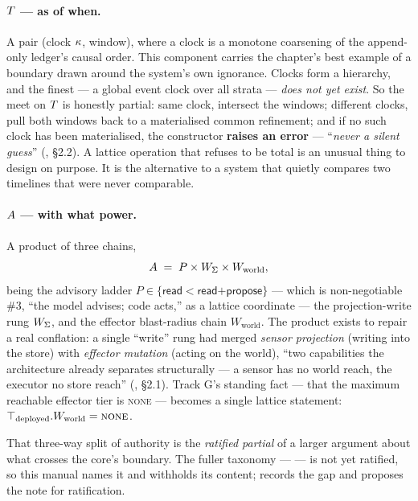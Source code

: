\paragraph{$T{}$ --- as of when.} A pair (clock $\kappa{}$, window),
where a clock is a monotone coarsening of the append-only ledger's causal order.
This component carries the chapter's best example of a boundary drawn around the
system's own ignorance. Clocks form a hierarchy, and the finest --- a global event
clock over all strata --- \emph{does not yet exist}. So the meet on
$T{}$ is honestly partial: same clock, intersect the windows; different
clocks, pull both windows back to a materialised common refinement; and if no such
clock has been materialised, the constructor \textbf{raises an error} ---
``\emph{never a silent guess}'' (, \S 2.2). A
lattice operation that refuses to be total is an unusual thing to design on
purpose. It is the alternative to a system that quietly compares two timelines that
were never comparable.

\paragraph{$A{}$ --- with what power.} A product of three chains,
\[
  A{} \;=\; P \times W_{\Sigma{}} \times W_{\text{world}},
\]
being the advisory ladder $P \in \{\textsf{read} < \textsf{read+propose}\}$ ---
which is non-negotiable \#3, ``the model advises; code acts,'' as a lattice
coordinate --- the projection-write rung $W_{\Sigma{}}$, and the effector
blast-radius chain $W_{\text{world}}$. The product exists to repair a real
conflation: a single ``write'' rung had merged \emph{sensor projection} (writing
into the store) with \emph{effector mutation} (acting on the world), ``two
capabilities the architecture already separates structurally --- a sensor has no
world reach, the executor no store reach'' (,
\S 2.1). Track G's standing fact --- that the maximum reachable effector tier is
\textsc{none} --- becomes a single lattice statement:
$\top_{\text{deployed}}.W_{\text{world}} = \textsc{none}$.

That three-way split of authority is the \emph{ratified partial} of a larger
argument about what crosses the core's boundary. The fuller taxonomy ---
 --- is not yet ratified, so this
manual names it and withholds its content;  records the gap
and proposes the note for ratification.

